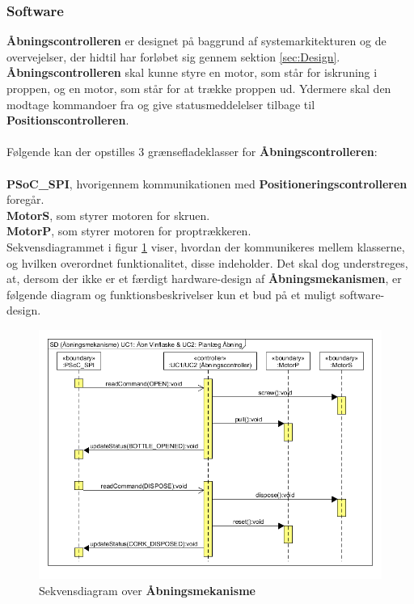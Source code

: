 \subsubsection{Software}
\textbf{Åbningscontrolleren} er designet på baggrund af systemarkitekturen og de overvejelser, der hidtil har forløbet sig gennem sektion \ref{sec:Design}. \\
\textbf{Åbningscontrolleren} skal kunne styre en motor, som står for iskruning i proppen, og en motor, som står for at trække proppen ud. Ydermere skal den modtage kommandoer fra og give statusmeddelelser tilbage til \textbf{Positionscontrolleren}. \\
\\
Følgende kan der opstilles 3 grænsefladeklasser for \textbf{Åbningscontrolleren}: \\
\\
\textbf{PSoC\_SPI}, hvorigennem kommunikationen med \textbf{Positioneringscontrolleren} foregår. \\
\textbf{MotorS}, som styrer motoren for skruen. \\
\textbf{MotorP}, som styrer motoren for proptrækkeren. \\

Sekvensdiagrammet i figur \ref{sd:Aab} viser, hvordan der kommunikeres mellem klasserne, og hvilken overordnet funktionalitet, disse indeholder. Det skal dog understreges, at, dersom der ikke er et færdigt hardware-design af \textbf{Åbningsmekanismen}, er følgende diagram og funktionsbeskrivelser kun et bud på et muligt software-design.

\begin{figure}[H]
	\centerline{\includegraphics[scale=0.33]{tex/Design/PSoC/Diagrammer/SD_Aabningsmekanisme}}
	\caption{Sekvensdiagram over \textbf{Åbningsmekanisme}}
	\label{sd:Aab}
\end{figure}


